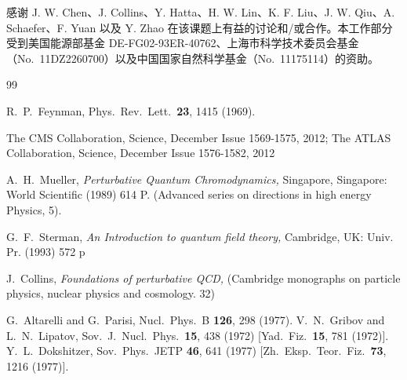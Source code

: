 感谢 J. W. Chen、J. Collins、Y. Hatta、H. W. Lin、K. F. Liu、J. W. Qiu、A. Schaefer、F. Yuan 以及 Y. Zhao 在该课题上有益的讨论和/或合作。本工作部分受到美国能源部基金 DE-FG02-93ER-40762、上海市科学技术委员会基金（No.\ 11DZ2260700）以及中国国家自然科学基金（No.\ 11175114）的资助。

\begin{thebibliography}{99}

  R.~P.~Feynman,
  Phys.\ Rev.\ Lett.\  {\bf 23}, 1415 (1969).

The CMS Collaboration, Science,  December Issue 1569-1575, 2012;
The ATLAS Collaboration, Science, December Issue 1576-1582, 2012

  A.~H.~Mueller,
{\it Perturbative Quantum Chromodynamics,}
  Singapore, Singapore: World Scientific (1989) 614 P. (Advanced series on directions in high energy Physics, 5).

  G.~F.~Sterman,
{\it An Introduction to quantum field theory,}
  Cambridge, UK: Univ. Pr. (1993) 572 p

  J.~Collins,
{\it  Foundations of perturbative QCD,}
  (Cambridge monographs on particle physics, nuclear physics and cosmology. 32)

  G.~Altarelli and G.~Parisi,
  Nucl.\ Phys.\ B {\bf 126}, 298 (1977).
  V.~N.~Gribov and L.~N.~Lipatov,
  Sov.\ J.\ Nucl.\ Phys.\  {\bf 15}, 438 (1972)
  [Yad.\ Fiz.\  {\bf 15}, 781 (1972)].
  Y.~L.~Dokshitzer,
  Sov.\ Phys.\ JETP {\bf 46}, 641 (1977)
  [Zh.\ Eksp.\ Teor.\ Fiz.\  {\bf 73}, 1216 (1977)].



\end{thebibliography}
